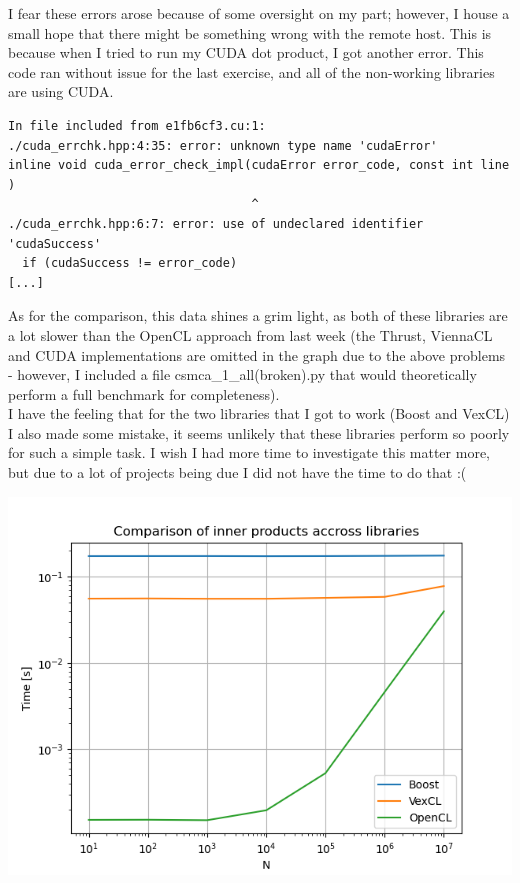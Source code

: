 \documentclass[11pt]{article}
\begin{document}
I fear these errors arose because of some oversight on my part; however, I house a small hope that there might be something wrong with the remote host. This is because when I tried to run my CUDA dot product, I got another error. This code ran without issue for the last exercise, and all of the non-working libraries are using CUDA.

\begin{tiny}
\begin{verbatim}
In file included from e1fb6cf3.cu:1:
./cuda_errchk.hpp:4:35: error: unknown type name 'cudaError'
inline void cuda_error_check_impl(cudaError error_code, const int line )
                                  ^
./cuda_errchk.hpp:6:7: error: use of undeclared identifier 'cudaSuccess'
  if (cudaSuccess != error_code)
[...]
\end{verbatim}
\end{tiny}

\newpage
As for the comparison, this data shines a grim light, as both of these libraries are a lot slower than the OpenCL approach from last week (the Thrust, ViennaCL and CUDA implementations are omitted in the graph due to the above problems - however, I included a file csmca_1_all(broken).py that would theoretically perform a full benchmark for completeness). \\

I have the feeling that for the two libraries that I got to work (Boost and VexCL) I also made some mistake, it seems unlikely that these libraries perform so poorly for such a simple task. I wish I had more time to investigate this matter more, but due to a lot of projects being due I did not have the time to do that :(

\includegraphics[scale=0.6]{plots/1.png}
\end{document}
